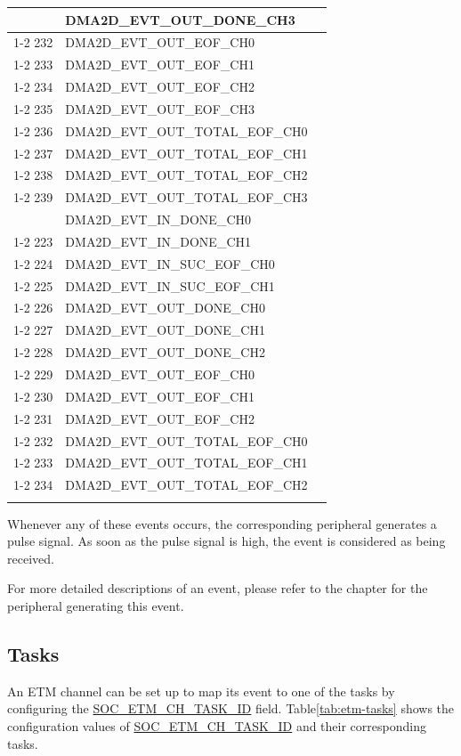 \documentclass[main\_\_EN.tex]{subfiles}
\begin{document}
\begin{longtable}{ | l | l | l | }
{231 & DMA2D\_EVT\_OUT\_DONE\_CH3  & \\ \cline{1-2}
232 & DMA2D\_EVT\_OUT\_EOF\_CH0  & \\ \cline{1-2}
233 & DMA2D\_EVT\_OUT\_EOF\_CH1  & \\ \cline{1-2}
234 & DMA2D\_EVT\_OUT\_EOF\_CH2  & \\ \cline{1-2}
235 & DMA2D\_EVT\_OUT\_EOF\_CH3  & \\ \cline{1-2}
236 & DMA2D\_EVT\_OUT\_TOTAL\_EOF\_CH0  & \\ \cline{1-2}
237 & DMA2D\_EVT\_OUT\_TOTAL\_EOF\_CH1  & \\ \cline{1-2}
238 & DMA2D\_EVT\_OUT\_TOTAL\_EOF\_CH2  & \\ \cline{1-2}
239 & DMA2D\_EVT\_OUT\_TOTAL\_EOF\_CH3  & \\ \hline
}{%
222 & DMA2D\_EVT\_IN\_DONE\_CH0  & \nameref{mod:2ddma} \\ \cline{1-2}
223 & DMA2D\_EVT\_IN\_DONE\_CH1  & \\ \cline{1-2}
224 & DMA2D\_EVT\_IN\_SUC\_EOF\_CH0  & \\ \cline{1-2}
225 & DMA2D\_EVT\_IN\_SUC\_EOF\_CH1  & \\ \cline{1-2}
226 & DMA2D\_EVT\_OUT\_DONE\_CH0  & \\ \cline{1-2}
227 & DMA2D\_EVT\_OUT\_DONE\_CH1  & \\ \cline{1-2}
228 & DMA2D\_EVT\_OUT\_DONE\_CH2  & \\ \cline{1-2}
229 & DMA2D\_EVT\_OUT\_EOF\_CH0  & \\ \cline{1-2}
230 & DMA2D\_EVT\_OUT\_EOF\_CH1  & \\ \cline{1-2}
231 & DMA2D\_EVT\_OUT\_EOF\_CH2  & \\ \cline{1-2}
232 & DMA2D\_EVT\_OUT\_TOTAL\_EOF\_CH0  & \\ \cline{1-2}
233 & DMA2D\_EVT\_OUT\_TOTAL\_EOF\_CH1  & \\ \cline{1-2}
234 & DMA2D\_EVT\_OUT\_TOTAL\_EOF\_CH2  & \\ \hline
}
\end{longtable}


Whenever any of these events occurs, the corresponding peripheral generates a pulse signal. As soon as the pulse signal is high, the event is considered as being received.

For more detailed descriptions of an event, please refer to the chapter for the peripheral generating this event.


\subsection{Tasks}
\label{sec:evntaskmatrix-tasks}
An ETM channel can be set up to map its event to one of the tasks by configuring the  \hyperref[fielddesc:SOCETMCH0TASKID]{SOC\_ETM\_CH\_TASK\_ID} field. Table\ref{tab:etm-tasks}  shows the configuration values of \hyperref[fielddesc:SOCETMCH0TASKID]{SOC\_ETM\_CH\_TASK\_ID} and their corresponding tasks.
\end{document}
